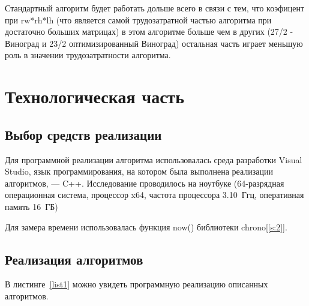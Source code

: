 \documentclass[14pt]{article}
\begin{document}
	Стандартный алгоритм будет работать дольше всего в связи с тем, что коэфицент при rw*rh*lh (что является самой трудозатратной частью алгоритма при достаточно больших матрицах) в этом алгоритме больше чем в других (27/2 - Виноград и 23/2 оптимизированный Виноград) остальная часть играет меньшую роль в значении трудозатратности алгоритма.
	\par
	
	\newpage
	
	\section{Технологическая часть} 
	
	\subsection{Выбор средств реализации}
	Для программной реализации алгоритма использовалась среда разработки Visual Studio, язык программирования, на котором была выполнена реализации алгоритмов, --- C++. 
	Исследование проводилось на ноутбуке (64-разрядная операционная система, процессор x64, частота процессора 3.10~Ггц, оперативная память 16~ГБ)\par
	Для замера времени использовалась функция now() библиотеки chrono[\ref{s:2}].
	
	\subsection{Реализация алгоритмов}
	В листинге~\ref{list1} можно увидеть программную реализацию описанных алгоритмов.
	
\end{document}
